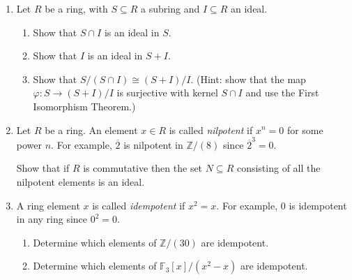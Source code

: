 \documentclass{article}
\begin{document}
\TestTitle[class={Abstract I}, name={Final Exam}, term=Fall, year=2015, date={}]

\begin{enumerate}
\item Let $R$ be a ring, with $S \subseteq R$ a subring and $I \subseteq R$ an ideal.

\begin{enumerate}
\item Show that $S \cap I$ is an ideal in $S$.

\item Show that $I$ is an ideal in $S + I$.

\item Show that $S/(S \cap I) \cong (S + I)/I$. (Hint: show that the map $\varphi : S \rightarrow (S+I)/I$ is surjective with kernel $S \cap I$ and use the First Isomorphism Theorem.)
\end{enumerate}

\item Let $R$ be a ring. An element $x \in R$ is called \emph{nilpotent} if $x^n = 0$ for some power $n$. For example, $\overline{2}$ is nilpotent in $\mathbb{Z}/(8)$ since $\overline{2}^3 = 0$.

Show that if $R$ is commutative then the set $N \subseteq R$ consisting of all the nilpotent elements is an ideal.

\item A ring element $x$ is called \emph{idempotent} if $x^2 = x$. For example, 0 is idempotent in any ring since $0^2 = 0$.
\begin{enumerate}
\item Determine which elements of $\mathbb{Z}/(30)$ are idempotent.
\item Determine which elements of $\mathbb{F}_3[x]/(x^2-x)$ are idempotent.
\end{enumerate}
\end{enumerate}
\end{document}
